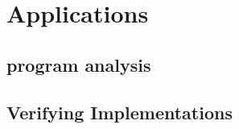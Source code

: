 \section{Applications}
\label{sec:applications}

\subsection{program analysis}

\subsection{Verifying Implementations}

